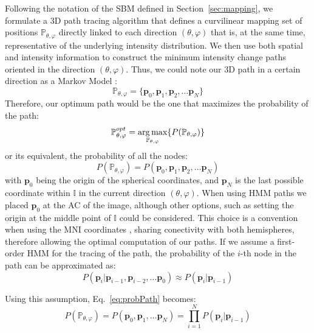 Following the notation of the \ac{SBM} defined in Section~\ref{sec:mapping}, we formulate a 3D path tracing algorithm that defines a curvilinear mapping set of positions $\mathbb{P}_{\theta,\varphi}$ directly linked to each direction $(\theta,\varphi)$ that is, at the same time, representative of the underlying intensity distribution. We then use both spatial and intensity information to construct the minimum intensity change paths oriented in the direction $(\theta,\varphi)$. Thus, we could note our 3D path in a certain direction as a Markov Model \cite{Chen2008}: 
\begin{equation}
\mathbb{P}_{\theta,\varphi} = \{\mathbf{p}_0, \mathbf{p}_1, \mathbf{p}_2, \dots \mathbf{p}_N\}
\end{equation}
Therefore, our optimum path would be the one that maximizes the probability of the path:
\begin{equation}\label{eq:optimalPath}
\mathbb{P}_{\theta,\varphi}^{opt} = \operatorname*{arg\,max}_{\mathbb{P}_{\theta,\varphi}} \{P(\mathbb{P}_{\theta,\varphi})\}
\end{equation}
or its equivalent, the probability of all the nodes:
\begin{equation}\label{eq:probPath}
P(\mathbb{P}_{\theta,\varphi}) = P(\mathbf{p}_0, \mathbf{p}_1, \mathbf{p}_2, \dots \mathbf{p}_N)
\end{equation}
with $\mathbf{p}_0$ being the origin of the spherical coordinates, and $\mathbf{p}_N$ is the last possible coordinate within $\mathbb{I}$ in the current direction $(\theta,\varphi)$. When using \ac{HMM} paths we placed $\mathbf{p}_0$ at the \ac{AC} of the image, although other options, such as setting the origin at the middle point of $\mathbb{I}$ could be considered. This choice is a convention when using the \ac{MNI} coordinates \cite{Evans1993}, sharing conectivity with both hemispheres, therefore allowing the optimal computation of our paths. If we assume a first-order \acf{HMM} for the tracing of the path, the probability of the $i$-th node in the path can be approximated as:
\begin{equation}
P(\mathbf{p}_i | \mathbf{p}_{i-1}, \mathbf{p}_{i-2}, \dots \mathbf{p}_0) \approx P(\mathbf{p}_i|\mathbf{p}_{i-1})
\end{equation}

Using this assumption, Eq.~\ref{eq:probPath} becomes:
\begin{equation}
P(\mathbb{P}_{\theta,\varphi}) = P(\mathbf{p}_0, \mathbf{p}_1, \dots \mathbf{p}_N) = \prod_{i=1}^{N} P(\mathbf{p}_i|\mathbf{p}_{i-1})
\end{equation} 

